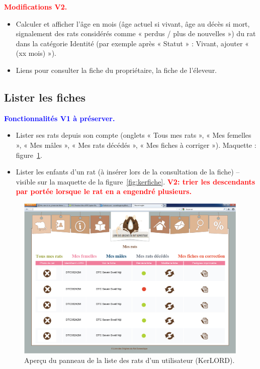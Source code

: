 ﻿\documentclass[a4paper,10pt]{article}
\newcommand\existant[1]{\noindent\textbf{\textcolor{blue}{#1}}}
\newcommand\desire[1]{\noindent\textbf{\textcolor{red}{#1}}}
\begin{document}
\desire{Modifications V2.}
\begin{itemize}
\item Calculer et afficher l'âge en mois (âge actuel si vivant, âge au décès si mort, signalement des rats considérés comme « perdus / plus de nouvelles ») du rat dans la catégorie Identité (par exemple après « Statut » : Vivant, ajouter « (xx mois) »).  
\item Liens pour consulter la fiche du propriétaire, la fiche de l'éleveur.
\end{itemize}

\subsection{Lister les fiches}
\existant{Fonctionnalités V1 à préserver.}
\begin{itemize}
\item Lister ses rats depuis son compte (onglets « Tous mes rats », « Mes femelles », « Mes mâles », « Mes rats décédés », « Mes fiches à corriger »). Maquette : figure~\ref{fig:kerdashuser}.   
\item Lister les enfants d'un rat (à insérer lors de la consultation de la fiche)  -- visible sur la maquette de la figure~\ref{fig:kerfiche}. \desire{V2: trier les descendants par portée lorsque le rat en a engendré plusieurs.}
\end{itemize}

\begin{figure}[htbp!]
\begin{center}\includegraphics[width=0.8\linewidth]{DashboardUser.jpg}\end{center}
\caption{Aperçu du panneau de la liste des rats d'un utilisateur (KerLORD).\label{fig:kerdashuser}}
\end{figure}
\end{document}
